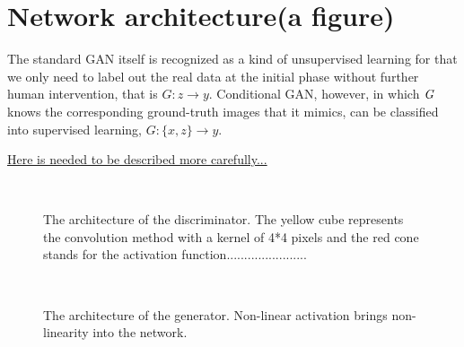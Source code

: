 \documentclass[floatfix]{emulateapj}
\begin{document}
\section{Network architecture(a figure)}\label{sect:network}
The standard GAN itself is recognized as a kind of unsupervised learning for that we only need to label out the real data at the initial phase without further human intervention, that is $G: z\rightarrow y$. Conditional GAN, however, in which $\it{G}$ knows the corresponding ground-truth images that it mimics, can be classified into supervised learning, $G: \{x,z\}\rightarrow y$.

\underline{Here is needed to be described more carefully...}
\begin{figure}[htpb]
\centering
\mbox{
}

\caption{The architecture of the discriminator. The yellow cube represents the convolution method with a kernel of 4*4 pixels and the red cone stands for the activation function....................... }
\label{fig:arch_D}
\end{figure}

\begin{figure}[htpb]
\centering
\mbox{
}

\caption{The architecture of the generator. Non-linear activation brings non-linearity into the network. }
\label{fig:arch_G}
\end{figure}
\end{document}
